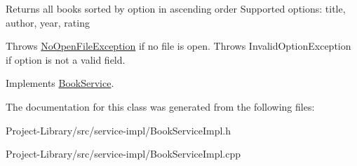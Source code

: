 Returns all books sorted by option in ascending order Supported options\+: title, author, year, rating

Throws \hyperlink{structNoOpenFileException}{No\+Open\+File\+Exception} if no file is open. Throws Invalid\+Option\+Exception if option is not a valid field. 

Implements \hyperlink{classBookService_a36b487f2828791a9956a491f5147471d}{Book\+Service}.



The documentation for this class was generated from the following files\+:\begin{DoxyCompactItemize}
\item 
Project-\/\+Library/src/service-\/impl/Book\+Service\+Impl.\+h\item 
Project-\/\+Library/src/service-\/impl/Book\+Service\+Impl.\+cpp\end{DoxyCompactItemize}
